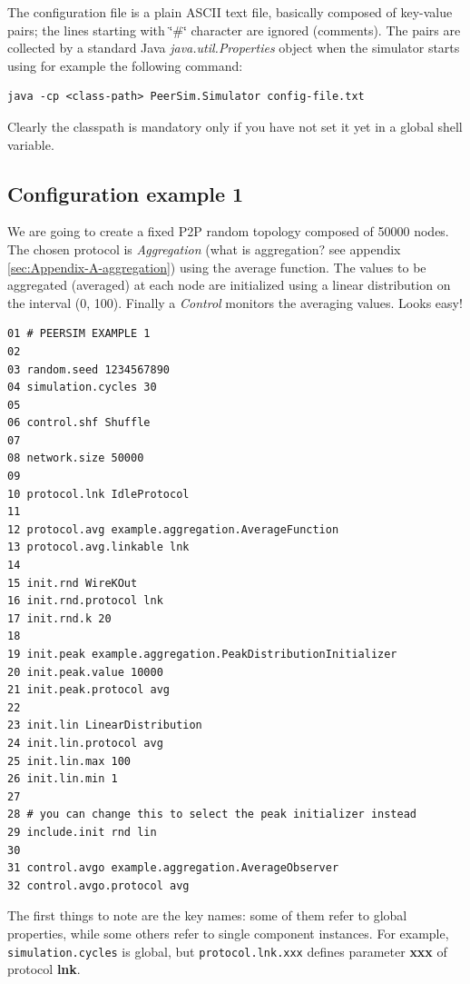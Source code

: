 \documentclass[a4paper,11pt]{article}
\begin{document}
The configuration file is a plain ASCII text file, basically composed of
key-value pairs; the lines starting with \char`\"{}\#\char`\"{} character
are ignored (comments). The pairs are collected by a standard Java
\emph{java.util.Properties} object when the simulator starts using
for example the following command:

\begin{verbatim}
java -cp <class-path> PeerSim.Simulator config-file.txt \end{verbatim}


Clearly the classpath is mandatory only if you have not set it yet
in a global shell variable.

\subsection{Configuration example 1}

We are going to create a fixed P2P random topology composed of 50000
nodes.
The chosen protocol is \emph{Aggregation} (what is
aggregation? see appendix \ref{sec:Appendix-A-aggregation}) using
the average function. The values to be aggregated (averaged) at each
node are initialized using a linear distribution on the interval (0,
100). Finally a \emph{Control} monitors the averaging values.
Looks easy!

\footnotesize
\begin{verbatim}
01 # PEERSIM EXAMPLE 1
02
03 random.seed 1234567890
04 simulation.cycles 30
05
06 control.shf Shuffle
07
08 network.size 50000
09 
10 protocol.lnk IdleProtocol
11
12 protocol.avg example.aggregation.AverageFunction
13 protocol.avg.linkable lnk
14 
15 init.rnd WireKOut
16 init.rnd.protocol lnk
17 init.rnd.k 20
18
19 init.peak example.aggregation.PeakDistributionInitializer
20 init.peak.value 10000
21 init.peak.protocol avg
22
23 init.lin LinearDistribution
24 init.lin.protocol avg
25 init.lin.max 100
26 init.lin.min 1
27
28 # you can change this to select the peak initializer instead
29 include.init rnd lin
30
31 control.avgo example.aggregation.AverageObserver
32 control.avgo.protocol avg
\end{verbatim}

\normalsize


The first things to note are the
key names: some of them refer to global properties, while some
others refer to single component instances. For example,
\texttt{simulation.cycles} is global, but \texttt{protocol.lnk.xxx}
defines parameter \textbf{xxx} of protocol \textbf{lnk}.
\end{document}
